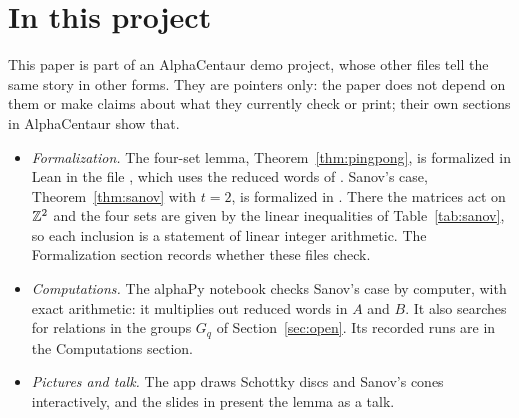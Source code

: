 \section{In this project}\label{sec:project}

This paper is part of an AlphaCentaur demo project, whose other files tell
the same story in other forms. They are pointers only: the paper does not
depend on them or make claims about what they currently check or print; their
own sections in AlphaCentaur show that.

\begin{itemize}
\item \emph{Formalization.} The four-set lemma, Theorem~\ref{thm:pingpong},
is formalized in Lean in the file , which
uses the reduced words of . Sanov's case,
Theorem~\ref{thm:sanov} with $t = 2$, is formalized in
. There the matrices act on $\mathbb{Z}^2$ and
the four sets are given by the linear inequalities of Table~\ref{tab:sanov},
so each inclusion is a statement of linear integer arithmetic. The
Formalization section records whether these files check.
\item \emph{Computations.} The alphaPy notebook
 checks Sanov's case by computer, with
exact arithmetic: it multiplies out reduced words in $A$ and $B$. It also
searches for relations in the groups $G_q$ of Section~\ref{sec:open}. Its
recorded runs are in the Computations section.
\item \emph{Pictures and talk.} The app
 draws Schottky discs and Sanov's cones
interactively, and the slides in  present the
lemma as a talk.
\end{itemize}
